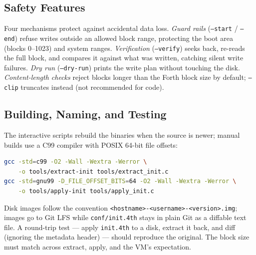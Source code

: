 \subsection{Safety Features}

Four mechanisms protect against accidental data loss. \emph{Guard rails}
(\texttt{--start} / \texttt{--end}) refuse writes outside an allowed block
range, protecting the boot area (blocks 0--1023) and system ranges.
\emph{Verification} (\texttt{--verify}) seeks back, re-reads the full block,
and compares it against what was written, catching silent write failures.
\emph{Dry run} (\texttt{--dry-run}) prints the write plan without touching the
disk. \emph{Content-length checks} reject blocks longer than the Forth block
size by default; \texttt{--clip} truncates instead (not recommended for code).

\subsection{Building, Naming, and Testing}

The interactive scripts rebuild the binaries when the source is newer; manual
builds use a C99 compiler with POSIX 64-bit file offsets:

\begin{lstlisting}[language=bash]
gcc -std=c99 -O2 -Wall -Wextra -Werror \
    -o tools/extract-init tools/extract_init.c
gcc -std=gnu99 -D_FILE_OFFSET_BITS=64 -O2 -Wall -Wextra -Werror \
    -o tools/apply-init tools/apply_init.c
\end{lstlisting}

Disk images follow the convention
\texttt{<hostname>-<username>-<version>.img}; images go to Git LFS while
\texttt{conf/init.4th} stays in plain Git as a diffable text file. A round-trip
test --- apply \texttt{init.4th} to a disk, extract it back, and diff (ignoring
the metadata header) --- should reproduce the original. The block size must
match across extract, apply, and the VM's expectation.

